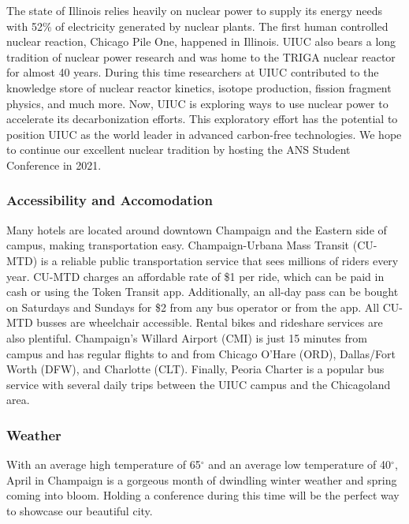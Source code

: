 The state of Illinois relies heavily on nuclear power to supply its energy needs with 52$\%$ of electricity generated by nuclear plants. The first human controlled nuclear reaction, Chicago Pile One, happened in Illinois. UIUC also bears a long tradition of nuclear power research and was home to the TRIGA nuclear reactor for almost 40 years. During this time researchers at UIUC contributed to the knowledge store of nuclear reactor kinetics, isotope production, fission fragment physics, and much more. Now, UIUC is exploring ways to use nuclear power to accelerate its decarbonization efforts. This exploratory effort has the potential to position UIUC as the world leader in advanced carbon-free technologies. We hope to continue our excellent nuclear tradition by hosting the ANS Student Conference in 2021. 
\clearpage

\subsubsection{Accessibility and Accomodation}
 Many hotels are located around downtown Champaign and the Eastern 
 side of campus, making transportation easy. Champaign-Urbana Mass Transit 
 (CU-MTD) is a reliable public transportation service that sees millions of 
 riders every year. CU-MTD charges an affordable rate of \$1 per ride, which 
 can be paid in cash or using the Token Transit app. Additionally, an all-day 
 pass can be bought on Saturdays and Sundays for \$2 from any bus operator or 
 from the app. All CU-MTD busses are wheelchair accessible. Rental bikes and 
 rideshare services are also plentiful.
 Champaign's Willard Airport (CMI) is just 15 minutes from campus and has 
regular flights to and from Chicago O’Hare (ORD), Dallas/Fort Worth (DFW), and 
Charlotte (CLT). Finally, Peoria Charter is a popular bus service with several 
daily trips between the UIUC campus and the Chicagoland area.

\subsubsection{Weather}
With an average high temperature of 65$^{\circ}$ and an average low temperature 
of 40$^{\circ}$, April in Champaign is a gorgeous month of dwindling winter 
weather and spring coming into bloom. Holding a conference during this time 
will be the perfect way to showcase our beautiful city.

